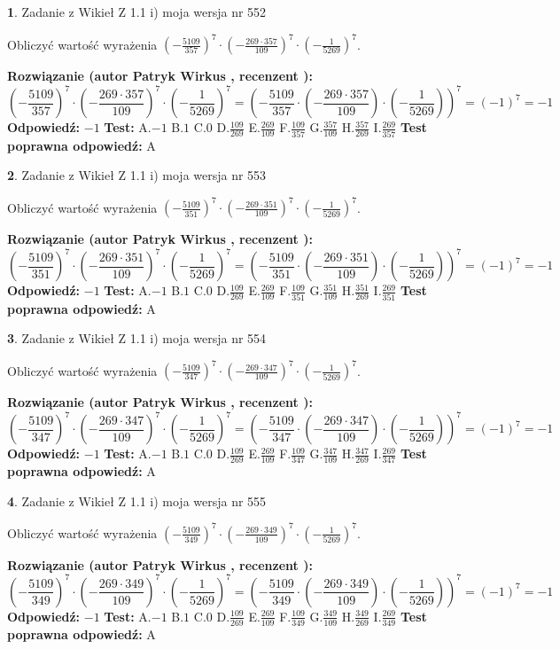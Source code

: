 \documentclass[12pt, a4paper]{article}
\theoremstyle{definition} %
\newtheorem{zad}{}
\newcommand{\zadStart}[1]{\begin{zad}#1\newline}
\newcommand{\zadStop}{\end{zad}}
\newcommand{\rozwStart}[2]{\noindent \textbf{Rozwiązanie (autor #1 , recenzent #2): }\newline}
\newcommand{\rozwStop}{\newline}
\newcommand{\odpStart}{\noindent \textbf{Odpowiedź:}\newline}
\newcommand{\odpStop}{\newline}
\newcommand{\testStart}{\noindent \textbf{Test:}\newline}
\newcommand{\testStop}{\newline}
\newcommand{\kluczStart}{\noindent \textbf{Test poprawna odpowiedź:}\newline}
\newcommand{\kluczStop}{\newline}
\begin{document}
\zadStart{Zadanie z Wikieł Z 1.1 i) moja wersja nr 552}

Obliczyć wartość wyrażenia $(-\frac{5109}{357})^{7} \cdot (-\frac{269 \cdot 357}{109})^{7} \cdot (-\frac{1}{5269})^{7}$.
\zadStop
\rozwStart{Patryk Wirkus}{}
$$(-\frac{5109}{357})^{7} \cdot (-\frac{269 \cdot 357}{109})^{7} \cdot (-\frac{1}{5269})^{7} = (-\frac{5109}{357} \cdot (-\frac{269 \cdot 357}{109}) \cdot (-\frac{1}{5269}))^{7} = (-1)^{7} = -1$$
\rozwStop
\odpStart
$-1$
\odpStop
\testStart
A.$-1$ B.$1$ C.$0$ D.$\frac{109}{269}$ E.$\frac{269}{109}$
F.$\frac{109}{357}$ G.$\frac{357}{109}$
H.$\frac{357}{269}$
I.$\frac{269}{357}$
\testStop
\kluczStart
A
\kluczStop



\zadStart{Zadanie z Wikieł Z 1.1 i) moja wersja nr 553}

Obliczyć wartość wyrażenia $(-\frac{5109}{351})^{7} \cdot (-\frac{269 \cdot 351}{109})^{7} \cdot (-\frac{1}{5269})^{7}$.
\zadStop
\rozwStart{Patryk Wirkus}{}
$$(-\frac{5109}{351})^{7} \cdot (-\frac{269 \cdot 351}{109})^{7} \cdot (-\frac{1}{5269})^{7} = (-\frac{5109}{351} \cdot (-\frac{269 \cdot 351}{109}) \cdot (-\frac{1}{5269}))^{7} = (-1)^{7} = -1$$
\rozwStop
\odpStart
$-1$
\odpStop
\testStart
A.$-1$ B.$1$ C.$0$ D.$\frac{109}{269}$ E.$\frac{269}{109}$
F.$\frac{109}{351}$ G.$\frac{351}{109}$
H.$\frac{351}{269}$
I.$\frac{269}{351}$
\testStop
\kluczStart
A
\kluczStop



\zadStart{Zadanie z Wikieł Z 1.1 i) moja wersja nr 554}

Obliczyć wartość wyrażenia $(-\frac{5109}{347})^{7} \cdot (-\frac{269 \cdot 347}{109})^{7} \cdot (-\frac{1}{5269})^{7}$.
\zadStop
\rozwStart{Patryk Wirkus}{}
$$(-\frac{5109}{347})^{7} \cdot (-\frac{269 \cdot 347}{109})^{7} \cdot (-\frac{1}{5269})^{7} = (-\frac{5109}{347} \cdot (-\frac{269 \cdot 347}{109}) \cdot (-\frac{1}{5269}))^{7} = (-1)^{7} = -1$$
\rozwStop
\odpStart
$-1$
\odpStop
\testStart
A.$-1$ B.$1$ C.$0$ D.$\frac{109}{269}$ E.$\frac{269}{109}$
F.$\frac{109}{347}$ G.$\frac{347}{109}$
H.$\frac{347}{269}$
I.$\frac{269}{347}$
\testStop
\kluczStart
A
\kluczStop



\zadStart{Zadanie z Wikieł Z 1.1 i) moja wersja nr 555}

Obliczyć wartość wyrażenia $(-\frac{5109}{349})^{7} \cdot (-\frac{269 \cdot 349}{109})^{7} \cdot (-\frac{1}{5269})^{7}$.
\zadStop
\rozwStart{Patryk Wirkus}{}
$$(-\frac{5109}{349})^{7} \cdot (-\frac{269 \cdot 349}{109})^{7} \cdot (-\frac{1}{5269})^{7} = (-\frac{5109}{349} \cdot (-\frac{269 \cdot 349}{109}) \cdot (-\frac{1}{5269}))^{7} = (-1)^{7} = -1$$
\rozwStop
\odpStart
$-1$
\odpStop
\testStart
A.$-1$ B.$1$ C.$0$ D.$\frac{109}{269}$ E.$\frac{269}{109}$
F.$\frac{109}{349}$ G.$\frac{349}{109}$
H.$\frac{349}{269}$
I.$\frac{269}{349}$
\testStop
\kluczStart
A
\kluczStop
\end{document}
